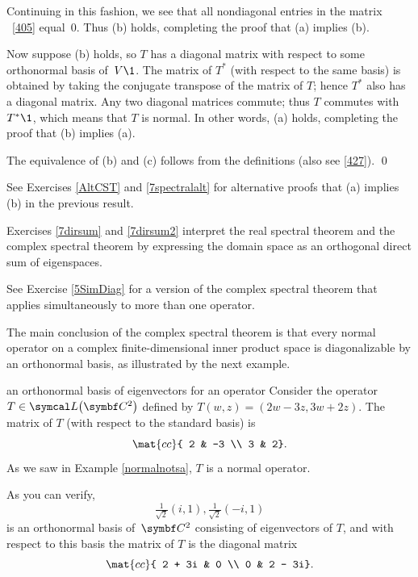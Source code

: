 Continuing in this fashion, we see that all nondiagonal entries in the matrix
~\ref{405} equal~$0$. Thus (b) holds, completing the proof that (a) implies (b).

Now suppose (b) holds, so $T$ has a diagonal matrix with respect to some orthonormal basis of~$V\1$.  The matrix of $T^*$
(with respect to the same basis) is obtained by  taking the conjugate transpose of
the matrix of $T$; hence $T^*$ also has a  diagonal matrix.  Any two diagonal
matrices commute; thus $T$ commutes  with~$T^*\1$, which means that $T$ is normal. In other words, (a) holds, completing the proof that (b) implies (a).

The equivalence of (b) and (c) follows from the definitions (also see \ref{427}).
\qed


See Exercises \ref{AltCST} and \ref{7spectralalt} for alternative proofs that (a) implies (b) in the previous result.

Exercises \ref{7dirsum} and \ref{7dirsum2} interpret the real spectral theorem and the complex spectral theorem by expressing the domain space as an orthogonal direct sum of eigenspaces.

See Exercise \ref{5SimDiag} for a version of the complex spectral theorem that applies simultaneously to more than one operator.

The main conclusion of the complex spectral theorem is that every normal operator on a complex finite-dimensional inner product space is diagonalizable by an orthonormal basis, as illustrated by the next example.

\begin{example}{an orthonormal basis of eigenvectors for an operator}
Consider the  operator
$T \in \L\paren[\big]{\C{2}}$ defined by $T(w, z) = (2w-3z, 3w + 2z)$. The matrix of $T$ (with respect to the standard basis) is
\[
\mat{cc}{
2 & -3 \\
3 & 2}.
\]
As we saw in Example \ref{normalnotsa}, $T$ is a normal operator.

As you can verify,
\[
\tfrac{1}{\sqrt{2}}(i, 1), \tfrac{1}{\sqrt{2}}(-i, 1)
\]
is an orthonormal basis of~$\C{2}$ consisting of eigenvectors of $T$, and with
respect to this basis the matrix of $T$ is the diagonal matrix
\[
\mat{cc}{
2 + 3i & 0 \\
0 & 2 - 3i}.
\]
\vspace{-.17in}
\end{example}

